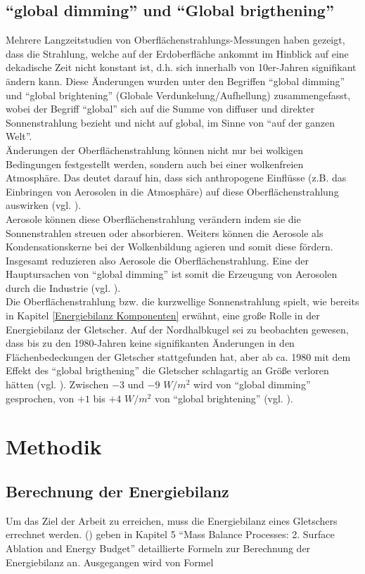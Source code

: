 \documentclass[11pt,a4paper]{article}
\begin{document}
\subsection{``global dimming'' und ``Global brigthening''}
Mehrere Langzeitstudien von Oberflächenstrahlungs-Messungen haben gezeigt, dass die Strahlung, welche auf der Erdoberfläche ankommt im Hinblick auf eine dekadische Zeit nicht konstant ist, d.h. sich innerhalb von 10er-Jahren signifikant ändern kann. Diese Änderungen wurden unter den Begriffen ``global dimming'' und ``global brightening'' (Globale Verdunkelung/Aufhellung) zusammengefasst, wobei der Begriff ``global'' sich auf die Summe von diffuser und direkter Sonnenstrahlung bezieht und nicht auf global, im Sinne von ``auf der ganzen Welt''.\\
Änderungen der Oberflächenstrahlung können nicht nur bei wolkigen Bedingungen festgestellt werden, sondern auch bei einer wolkenfreien Atmosphäre. Das deutet darauf hin, dass sich anthropogene Einflüsse (z.B. das Einbringen von Aerosolen in die Atmosphäre) auf diese Oberflächenstrahlung auswirken (vgl. \cite[1]{GlobalDimming}).\\
Aerosole können diese Oberflächenstrahlung verändern indem sie die Sonnenstrahlen streuen oder absorbieren. Weiters können die Aerosole als Kondensationskerne bei der Wolkenbildung agieren und somit diese fördern. Insgesamt reduzieren also Aerosole die Oberflächenstrahlung. Eine der Hauptursachen von ``global dimming'' ist somit die Erzeugung von Aerosolen durch die Industrie (vgl. \cite[14]{GlobalDimming}).\\ 
Die Oberflächenstrahlung bzw. die kurzwellige Sonnenstrahlung spielt, wie bereits in Kapitel \ref{Energiebilanz Komponenten} erwähnt, eine große Rolle in der Energiebilanz der Gletscher. Auf der Nordhalbkugel sei zu beobachten gewesen, dass bis zu den 1980-Jahren keine signifikanten Änderungen in den Flächenbedeckungen der Gletscher stattgefunden hat, aber ab ca. 1980 mit dem Effekt des ``global brigthening'' die Gletscher schlagartig an Größe verloren hätten (vgl. \cite[24]{GlobalDimming}). Zwischen $-3$ und $-9$ $W/m^2$ wird von ``global dimming'' gesprochen, von $+1$ bis $+4$ $W/m^2$ von ``global brightening'' (vgl. \cite[28]{EnlighteningGlobalDimming}).


\pagebreak
\section{Methodik}
\subsection{Berechnung der Energiebilanz}
Um das Ziel der Arbeit zu erreichen, muss die Energiebilanz eines Gletschers errechnet werden. \citeauthor{ThePhysicsOfGlaciers} (\citeyear{ThePhysicsOfGlaciers}) geben in Kapitel 5 ``Mass Balance Processes: 2. Surface Ablation and Energy Budget'' detaillierte Formeln zur Berechnung der Energiebilanz an. Ausgegangen wird von Formel 
\end{document}
